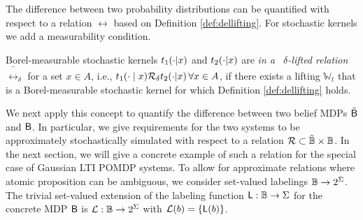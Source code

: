 \documentclass{ifacconf}
\begin{document}
%
%
The difference between two probability distributions can be quantified with respect to a relation $\rel$ based on Definition \ref{def:dellifting}. For stochastic kernels we add a measurability condition.
\begin{definition}\label{def:kernellift}
		Borel-measurable stochastic kernels $t_1(\cdot {\mid} x)$ and $t_2(\cdot {\mid} x)$ are \emph{in a \ $\delta$-lifted relation $\bar \rel_\delta$} for a set $x\in A$, i.e.,  $t_1(\cdot \mid x) \relax \mathcal{R}_\delta t_2(\cdot {\mid} x)\, \forall x\in A$,  if there exists a lifting $\mathbb W_t$ that is a  Borel-measurable stochastic kernel for which Definition \ref{def:dellifting} holds.
\end{definition}
We next apply this concept to quantify the difference between two belief MDPs $\tilde {\mathsf{B}}$ and $\mathsf{B}$. In particular, we give requirements for the two systems  to be approximately stochastically simulated with respect to a relation $\mathcal{R}\subset \tilde {\mathbb{B}} \times \mathbb{B}$. In the next section, we will give a concrete example of such a relation for the special case of Gaussian LTI POMDP systems. To allow for approximate relations where atomic proposition can be ambiguous, we consider set-valued labelings $\mathbb{B}\rightarrow2^\Sigma$. The trivial set-valued extension of the labeling function $\mathsf{L} : \mathbb{B} \rightarrow \Sigma$ for the concrete MDP $\mathsf{B}$ is $\mathcal{L}: \mathbb{B} \rightarrow2^\Sigma$ with $\mathcal{L}(b)=\{\mathsf{L}(b)\}$.
\end{document}
